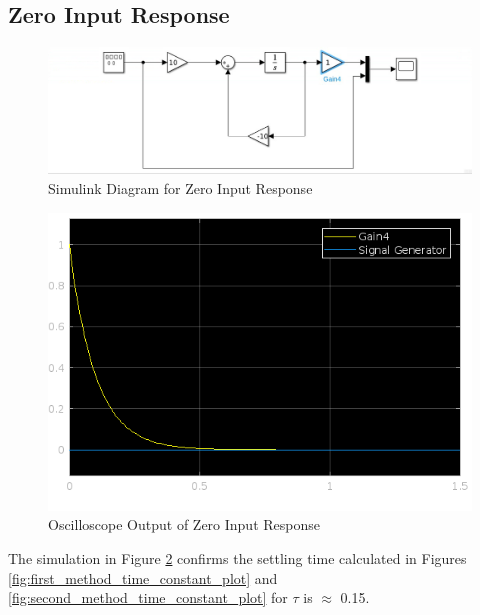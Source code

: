 \documentclass[12pt]{article}
\begin{document}
		\subsection{Zero Input Response}
			\begin{figure}[H]
				\centering
				\includegraphics[width=1\linewidth]{"Code/Fig/part2_1_slx.png"} %
				\caption{Simulink Diagram for Zero Input Response}
				\label{fig:slx_zero_input_diagram}
			\end{figure}	
			\begin{figure}[H]
				\centering
				\includegraphics[width=0.8\linewidth]{"Code/Fig/zero_input_output.png"} 
				\caption{Oscilloscope Output of Zero Input Response}
				\label{fig:slx_zero_input_output}
			\end{figure}
			The simulation in Figure \ref{fig:slx_zero_input_output} confirms the settling time calculated in Figures \ref{fig:first_method_time_constant_plot} and \ref{fig:second_method_time_constant_plot} for $\tau$ is $\approx$ 0.15.
\end{document}
